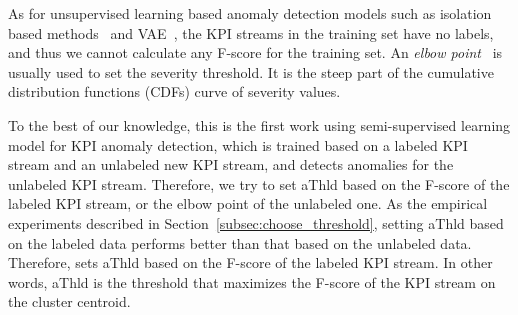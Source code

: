  As for unsupervised learning based anomaly detection models such as isolation based methods~\cite{ding2013anomaly} and VAE~\cite{xu2018unsupervised}, the KPI streams in the training set have no labels, and thus we cannot calculate any F-score for the training set.
 An \emph{elbow point}~\cite{ketchen1996application} is usually used to set the severity threshold.
 It is the steep part of the cumulative distribution functions (CDFs) curve of severity values.


 To the best of our knowledge, this is the first work using semi-supervised learning model for KPI anomaly detection, which is trained based on a labeled KPI stream and an unlabeled new KPI stream, and detects anomalies for the unlabeled KPI stream.
 Therefore, we try to set aThld based on the F-score of the labeled KPI stream, or the elbow point of the unlabeled one.
 As the empirical experiments described in 
 Section~\ref{subsec:choose_threshold}, setting aThld based on the labeled data performs better than that based on the unlabeled data.
 Therefore, \name{} sets aThld based on the F-score of the labeled KPI stream.
 In other words, aThld is the threshold that maximizes the F-score of the KPI stream on the cluster centroid.








